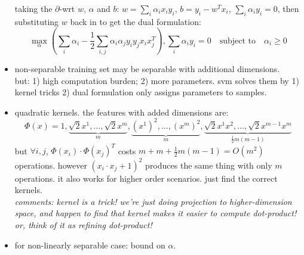 \documentclass{article}
\begin{document}
\begin{itemize}
\begin{equation}
		\end{equation}
		taking the $\partial$-wrt $w$, $\alpha$ and $b$: 
		$w=\sum_i\alpha_ix_iy_i$, $b=y_i-w^Tx_i$, $\sum_i\alpha_iy_i=0$, then
		substituting $w$ back in to get the dual formulation:
		\begin{equation}
			\max_{\alpha}\left(\sum_i\alpha_i-\frac12\sum_{i,j}\alpha_i\alpha_jy_iy_jx_ix_j^T\right)
			,\sum_i{\alpha_iy_i=0}\quad\text{subject to}\quad\alpha_i\ge0
		\end{equation}
	\item non-separable training set may be separable with additional dimensions. \\
		but: 1) high computation burden; 2) more parameters. svm solves them 
		by 1) kernel tricks 2) dual formulation only assigns parameters to samples. 
	\item quadratic kernels. the features with added dimensions are: 
		\begin{equation}
			\Phi(x)=1,\underbrace{\sqrt2x^1,\dots,\sqrt2x^m}_{m}
			,\underbrace{(x^1)^2,\dots,(x^m)^2}_{m}
			,\underbrace{	\sqrt2x^1x^2,\dots,\sqrt2x^{m-1}x^m}_{\frac12m(m-1)}
		\end{equation}
		but $\forall i,j$, $\Phi(x_i)\cdot\Phi(x_j)^T$ costs $m+m+\frac12m(m-1)=O(m^2)$ operations. 
		however $(x_i\cdot x_j+1)^2$ produces the same thing with only $m$ operations. 
		it also works for higher order scenarios. just find the correct kernels. \\
		{\it comments: kernel is a trick! we're just doing projection to higher-dimension space, 
			and happen to find that kernel makes it easier to compute dot-product! or, think of 
			it as refining dot-product!}
	\item for non-linearly separable case: bound on $\alpha$. 
\end{itemize}
\end{document}
